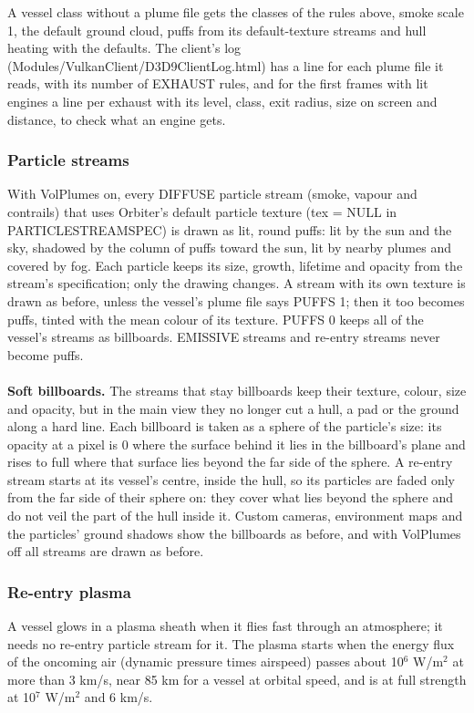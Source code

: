\documentclass[Orbiter Developer Manual.tex]{subfiles}
\begin{document}
\begin{sloppypar}
\noindent
A vessel class without a plume file gets the classes of the rules above, smoke scale 1, the default ground cloud, puffs from its default-texture streams and hull heating with the defaults. The client's log (Modules/VulkanClient/D3D9ClientLog.html) has a line for each plume file it reads, with its number of EXHAUST rules, and for the first frames with lit engines a line per exhaust with its level, class, exit radius, size on screen and distance, to check what an engine gets.


\subsubsection{Particle streams}
\label{sssec:vk_puffs}
With VolPlumes on, every DIFFUSE particle stream (smoke, vapour and contrails) that uses Orbiter's default particle texture (tex = NULL in PARTICLESTREAMSPEC) is drawn as lit, round puffs: lit by the sun and the sky, shadowed by the column of puffs toward the sun, lit by nearby plumes and covered by fog. Each particle keeps its size, growth, lifetime and opacity from the stream's specification; only the drawing changes. A stream with its own texture is drawn as before, unless the vessel's plume file says PUFFS 1; then it too becomes puffs, tinted with the mean colour of its texture. PUFFS 0 keeps all of the vessel's streams as billboards. EMISSIVE streams and re-entry streams never become puffs.\\
\\
\textbf{Soft billboards.} The streams that stay billboards keep their texture, colour, size and opacity, but in the main view they no longer cut a hull, a pad or the ground along a hard line. Each billboard is taken as a sphere of the particle's size: its opacity at a pixel is 0 where the surface behind it lies in the billboard's plane and rises to full where that surface lies beyond the far side of the sphere. A re-entry stream starts at its vessel's centre, inside the hull, so its particles are faded only from the far side of their sphere on: they cover what lies beyond the sphere and do not veil the part of the hull inside it. Custom cameras, environment maps and the particles' ground shadows show the billboards as before, and with VolPlumes off all streams are drawn as before.


\subsubsection{Re-entry plasma}
A vessel glows in a plasma sheath when it flies fast through an atmosphere; it needs no re-entry particle stream for it. The plasma starts when the energy flux of the oncoming air (dynamic pressure times airspeed) passes about 10$^6$ W/m$^2$ at more than 3 km/s, near 85 km for a vessel at orbital speed, and is at full strength at 10$^7$ W/m$^2$ and 6 km/s.


\end{sloppypar}
\end{document}
